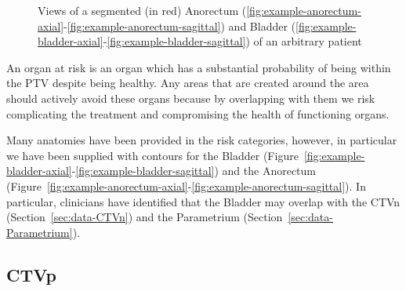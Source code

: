 \documentclass[11pt,twoside]{report}
\begin{document}
\begin{figure}[H]
{   \label{fig:example-bladder-coronal}
  }
  \caption{Views of a segmented (in red) Anorectum (\ref{fig:example-anorectum-axial}-\ref{fig:example-anorectum-sagittal}) and Bladder (\ref{fig:example-bladder-axial}-\ref{fig:example-bladder-sagittal}) of an arbitrary patient}
\end{figure}

An organ at risk is an organ which has a substantial probability of being within the PTV despite being healthy. Any areas that are created around the area should actively avoid these organs because by overlapping with them we risk complicating the treatment and compromising the health of functioning organs.

Many anatomies have been provided in the risk categories, however, in particular we have been supplied with contours for the Bladder (Figure~\ref{fig:example-bladder-axial}-\ref{fig:example-bladder-sagittal}) and the Anorectum (Figure~\ref{fig:example-anorectum-axial}-\ref{fig:example-anorectum-sagittal}). In particular, clinicians have identified that the Bladder may overlap with the CTVn (Section~\ref{sec:data-CTVn}) and the Parametrium (Section~\ref{sec:data-Parametrium}).

\subsection{CTVp}\label{sec:data-CTVp}
\end{document}
